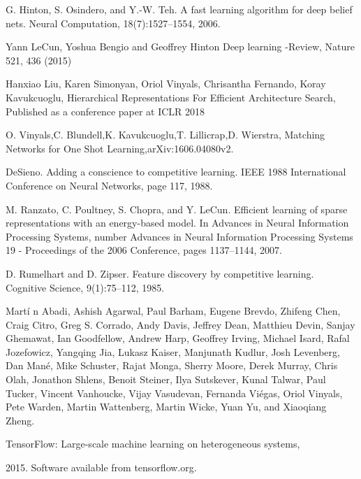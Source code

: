 \begin{thebibliography}{99}
 G. Hinton, S. Osindero, and Y.-W. Teh. A fast learning
algorithm for deep belief nets. Neural Computation, 18(7):1527–1554, 2006.
  
 Yann LeCun, Yoshua Bengio and Geoffrey Hinton
Deep learning -Review, Nature 521, 436 (2015)

 Hanxiao Liu, Karen Simonyan, Oriol Vinyals, Chrisantha Fernando, Koray Kavukcuoglu, Hierarchical Representations For Efficient Architecture Search, Published as a conference paper at ICLR 2018 

 O. Vinyals,C. Blundell,K. Kavukcuoglu,T. Lillicrap,D. Wierstra, Matching Networks for One Shot Learning,arXiv:1606.04080v2.

 DeSieno. Adding a conscience to competitive learning.
IEEE 1988 International Conference on Neural Networks, page 117, 1988.

 M. Ranzato, C. Poultney, S. Chopra, and Y. LeCun. Efficient learning of sparse representations with an energy-based model. In Advances in Neural Information Processing Systems, number Advances in Neural Information Processing Systems 19 - Proceedings of the 2006 Conference, pages 1137–1144, 2007.

 D. Rumelhart and D. Zipser. Feature discovery by competitive learning. Cognitive Science, 9(1):75–112, 1985.

 Mart\'i n Abadi, Ashish Agarwal, 
Paul Barham, Eugene Brevdo, Zhifeng Chen, Craig Citro, 
Greg S. Corrado, Andy Davis, Jeffrey Dean, Matthieu Devin, 
Sanjay Ghemawat, Ian Goodfellow, Andrew Harp, Geoffrey Irving, 
Michael Isard, Rafal Jozefowicz, Yangqing Jia, Lukasz Kaiser, 
Manjunath Kudlur, Josh Levenberg, Dan Man\'e, Mike Schuster,
Rajat Monga, Sherry Moore, Derek Murray, Chris Olah, Jonathon Shlens,
Benoit Steiner, Ilya Sutskever, Kunal Talwar, Paul Tucker,
Vincent Vanhoucke, Vijay Vasudevan, Fernanda Vi\'egas,
Oriol Vinyals, Pete Warden, Martin Wattenberg, Martin Wicke,
Yuan Yu, and Xiaoqiang Zheng.

TensorFlow: Large-scale machine learning on heterogeneous systems,

2015. Software available from tensorflow.org.  



\end{thebibliography}




